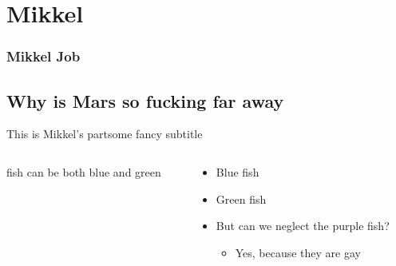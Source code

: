 \section{Mikkel}
\begin{frame}
	\frametitle{Mikkel Job}
	\tableofcontents[currentsection]
\end{frame}

\subsection{Why is Mars so fucking far away}
\begin{frame}{This is Mikkel's part}{some fancy subtitle}		
	\begin{columns}
		\begin{column}{0.5\textwidth}
		fish can be both blue and green	
		\end{column}
		\begin{column}{0.5\textwidth} 
		\begin{itemize}
			\item<1-> Blue fish
			\item<2-> Green fish
			\item<3-> But can we neglect the purple fish?
			\begin{itemize}
				\item<4-> Yes, because they are gay
			\end{itemize}			
		\end{itemize}		
		\end{column}
	\end{columns}
\end{frame}